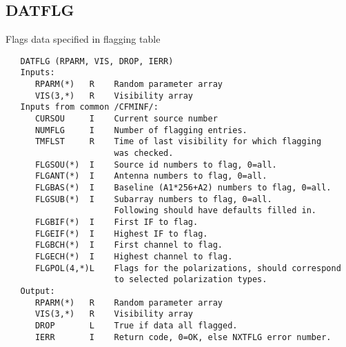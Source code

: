 \subsection{DATFLG}
Flags data specified in flagging table
\begin{verbatim}
   DATFLG (RPARM, VIS, DROP, IERR)
   Inputs:
      RPARM(*)   R    Random parameter array
      VIS(3,*)   R    Visibility array
   Inputs from common /CFMINF/:
      CURSOU     I    Current source number
      NUMFLG     I    Number of flagging entries.
      TMFLST     R    Time of last visibility for which flagging
                      was checked.
      FLGSOU(*)  I    Source id numbers to flag, 0=all.
      FLGANT(*)  I    Antenna numbers to flag, 0=all.
      FLGBAS(*)  I    Baseline (A1*256+A2) numbers to flag, 0=all.
      FLGSUB(*)  I    Subarray numbers to flag, 0=all.
                      Following should have defaults filled in.
      FLGBIF(*)  I    First IF to flag.
      FLGEIF(*)  I    Highest IF to flag.
      FLGBCH(*)  I    First channel to flag.
      FLGECH(*)  I    Highest channel to flag.
      FLGPOL(4,*)L    Flags for the polarizations, should correspond
                      to selected polarization types.
   Output:
      RPARM(*)   R    Random parameter array
      VIS(3,*)   R    Visibility array
      DROP       L    True if data all flagged.
      IERR       I    Return code, 0=OK, else NXTFLG error number.
\end{verbatim}

